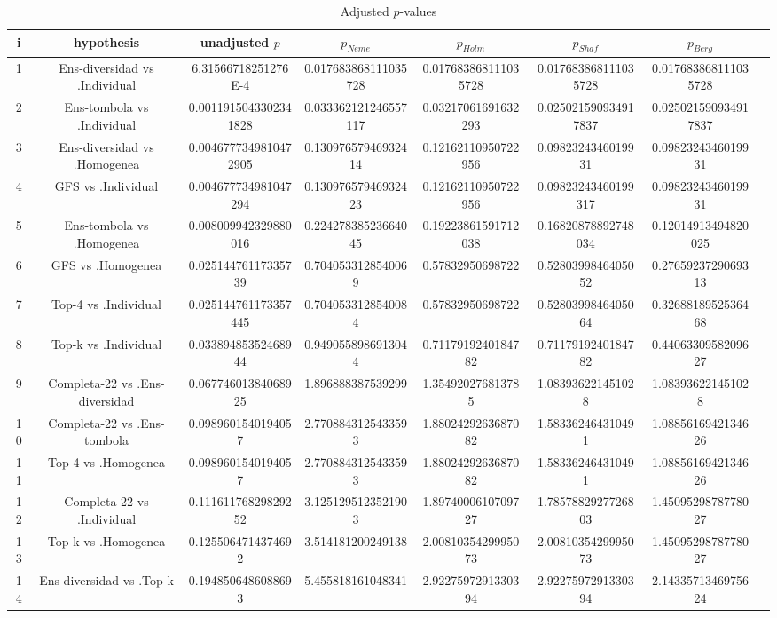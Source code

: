 \documentclass[a4paper,10pt]{article}
\begin{document}
\begin{landscape}
\begin{table}[!htp]
\centering\tiny
\caption{Adjusted $p$-values}
\begin{tabular}{cccccccc}
i&hypothesis&unadjusted $p$&$p_{Neme}$&$p_{Holm}$&$p_{Shaf}$&$p_{Berg}$\\
\hline
1&Ens-diversidad vs .Individual&6.31566718251276E-4&0.017683868111035728&0.017683868111035728&0.017683868111035728&0.017683868111035728\\
2&Ens-tombola vs .Individual&0.0011915043302341828&0.033362121246557117&0.03217061691632293&0.025021590934917837&0.025021590934917837\\
3&Ens-diversidad vs .Homogenea&0.0046777349810472905&0.13097657946932414&0.12162110950722956&0.0982324346019931&0.0982324346019931\\
4&GFS vs .Individual&0.004677734981047294&0.13097657946932423&0.12162110950722956&0.09823243460199317&0.0982324346019931\\
5&Ens-tombola vs .Homogenea&0.008009942329880016&0.22427838523664045&0.19223861591712038&0.16820878892748034&0.12014913494820025\\
6&GFS vs .Homogenea&0.02514476117335739&0.7040533128540069&0.57832950698722&0.5280399846405052&0.2765923729069313\\
7&Top-4 vs .Individual&0.025144761173357445&0.7040533128540084&0.57832950698722&0.5280399846405064&0.3268818952536468\\
8&Top-k vs .Individual&0.03389485352468944&0.9490558986913044&0.7117919240184782&0.7117919240184782&0.4406330958209627\\
9&Completa-22 vs .Ens-diversidad&0.06774601384068925&1.896888387539299&1.354920276813785&1.083936221451028&1.083936221451028\\
10&Completa-22 vs .Ens-tombola&0.0989601540194057&2.7708843125433593&1.8802429263687082&1.583362464310491&1.0885616942134626\\
11&Top-4 vs .Homogenea&0.0989601540194057&2.7708843125433593&1.8802429263687082&1.583362464310491&1.0885616942134626\\
12&Completa-22 vs .Individual&0.11161176829829252&3.1251295123521903&1.8974000610709727&1.7857882927726803&1.4509529878778027\\
13&Top-k vs .Homogenea&0.1255064714374692&3.514181200249138&2.0081035429995073&2.0081035429995073&1.4509529878778027\\
14&Ens-diversidad vs .Top-k&0.1948506486088693&5.455818161048341&2.9227597291330394&2.9227597291330394&2.1433571346975624\\

\end{tabular}
\end{table}
\end{landscape}
\end{document}
